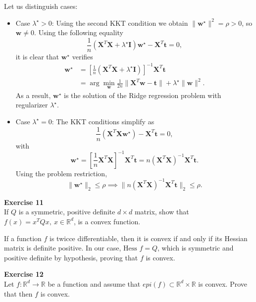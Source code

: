 \documentclass[11pt,table]{article}
\newenvironment{problem}[2][Exercise]
{ \begin{mdframed}[backgroundcolor=gray!20] \textbf{#1 #2} \\}
	{  \end{mdframed}}
\begin{document}
	Let us distinguish cases:
	
	\begin{itemize}
		\item Case $\lambda^\star > 0$: Using the second KKT condition we obtain \(\|\bm{w}^\star\|^2 = \rho > 0\), so \(\bm{w} \neq 0\). 
		Using the following equality
		\[
		\frac{1}{n} (\bm{X}^T \bm{X} + \lambda^\star \bm{I})\bm{w}^\star - \bm{X}^T\bm{t} = 0,
		\]
		it is clear that \(\bm{w}^\star\) verifies
		\[\begin{aligned}
			\bm{w}^\star &= \left[ \frac{1}{n} (\bm{X}^T \bm{X} + \lambda^\star \bm{I})\right]^{-1}\bm{X}^T \bm{t}\\
			&= \arg \min_{\bm{w}} \frac{1}{2n} \|\bm{X}^T \bm{w} - \bm{t}\| + \lambda^\star \|\bm{w}\|^2.
		\end{aligned}\]
		As a result, \(\bm{w}^\star\) is the solution of the Ridge regression problem with regularizer \(\lambda^\star\).
		\item Case \(\lambda^\star = 0\): The KKT conditions simplify as
		\[
		\frac{1}{n} \left(\bm{X}^T \bm{X}\bm{w}^\star\right) - \bm{X}^T\bm{t} = 0,
		\]
		with 
		\[
		\bm{w}^\star = \left[ \frac{1}{n} \bm{X}^T \bm{X}\right]^{-1}\bm{X}^T \bm{t} = n(\bm X^T\bm X)^{-1} \bm X^T\bm{t}.
		\]
		Using the problem restriction,
		\[
		\|\bm{w}^\star\|_2 \leq \rho \implies \| n(\bm X^T\bm X)^{-1} \bm X^T\bm{t} \|_2 \leq \rho.
		\]
	\end{itemize}
	
	
	
	\begin{problem}{11}
		If \( Q \) is a symmetric, positive definite \( d \times d \) matrix, show that \( f(x) = x^TQx, \ x \in \mathbb{R}^d \), is a convex function.
	\end{problem}
	
	If a function $f$ is twicce differentiable, then it is convex if and only if its Hessian matrix is definite positive. In our case, $\text{Hess }f = Q$, which is symmetric and positive definite by hypothesis, proving that $f$ is convex. \\
	
	\begin{problem}{12}
		Let \( f:\mathbb{R}^d \to \mathbb{R} \)  be a function and assume that \( epi(f) \subset \mathbb{R}^d \times \mathbb{R} \)  is convex. Prove that then \( f \)  is convex.
		
	\end{problem}
	
\end{document}
